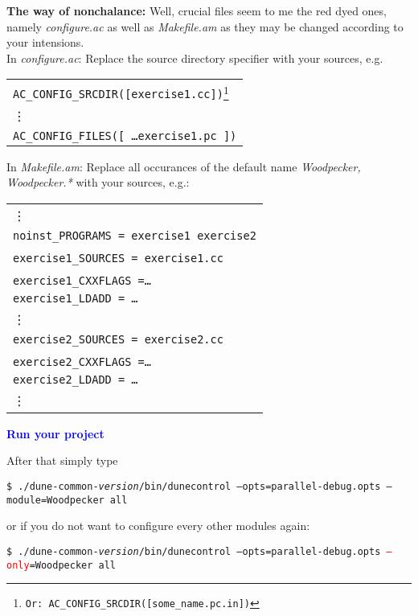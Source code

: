 \documentclass[a4paper,12pt]{article}
\newcommand{\dyeitred}{\textcolor{red}}{}
\begin{document}
\smallskip
\textbf{\textsf{The way of nonchalance:}} Well, crucial files seem to me the
red dyed ones, namely \textit{configure.ac} as well as \textit{Makefile.am} as
they may be changed according to your intensions.\\
In  \textit{configure.ac}: Replace the source directory specifier with your
sources, e.g.
\begin{center}
\begin{tabular}{l}
  \texttt{AC\_CONFIG\_SRCDIR([exercise1.cc])\footnote{Or:
      \texttt{AC\_CONFIG\_SRCDIR([some\_name.pc.in])} }}\\
 \vdots\\ 
 \texttt{AC\_CONFIG\_FILES([ \ldots exercise1.pc ])}

\end{tabular}
\end{center}
In  \textit{Makefile.am}: Replace all occurances of the default name \textit{Woodpecker,
  Woodpecker.*} with your sources, e.g.:
\begin{center}
  \begin{tabular}{l}
  \vdots\\
  \texttt{noinst\_PROGRAMS = exercise1 exercise2}\\ \\
  \texttt{exercise1\_SOURCES = exercise1.cc}\\ \\
  \texttt{exercise1\_CXXFLAGS =\ldots}\\
  \texttt{exercise1\_LDADD = \ldots}\\ 
   \vdots\\
   \texttt{exercise2\_SOURCES = exercise2.cc}\\ \\
  \texttt{exercise2\_CXXFLAGS =\ldots}\\
  \texttt{exercise2\_LDADD = \ldots}\\ 
  \vdots
  
\end{tabular}
\end{center}

\begin{center} \textcolor{blue}{\textbf{\textsf{Run your project}}}\end{center}
After that simply type
\begin{center}
  \texttt{\$ ./dune-common-\textit{version}/bin/dunecontrol --opts=parallel-debug.opts --module=Woodpecker all}
\end{center}

or if you do not want to configure every other modules again:
\begin{center}
  \texttt{\$ ./dune-common-\textit{version}/bin/dunecontrol --opts=parallel-debug.opts \dyeitred{--only}=Woodpecker all}
\end{center}
\end{document}
